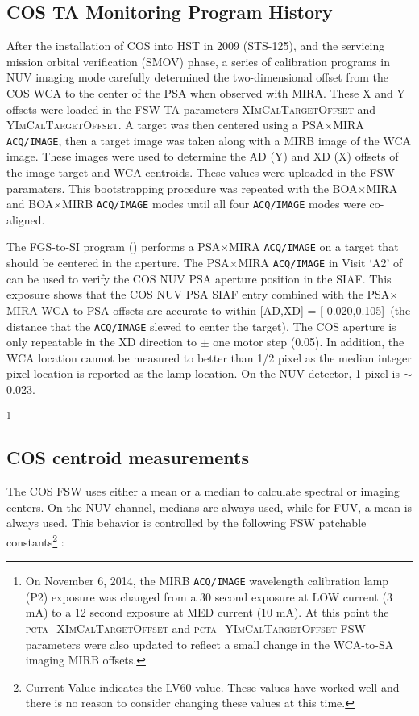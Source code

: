 \subsection{COS TA Monitoring Program History}\label{subsec:History}
After the installation of COS into HST in 2009 (STS-125), and the
servicing mission orbital verification (SMOV) phase,
a series of calibration programs in NUV imaging mode carefully determined the two-dimensional offset from the COS WCA to the center of the PSA when observed with MIRA.
These X and Y offsets were loaded in the FSW TA parameters \textsc{XImCalTargetOffset} and \textsc{YImCalTargetOffset}.
A target was then centered using a PSA$\times$MIRA \texttt{ACQ/IMAGE}, then a target image was taken along with a MIRB image
of the WCA image. These images were used to determine the AD (Y) and XD (X) offsets of the image target and WCA centroids.
These values were uploaded in the FSW paramaters. This bootstrapping procedure was repeated with the BOA$\times$MIRA
and BOA$\times$MIRB \texttt{ACQ/IMAGE} modes until all four \texttt{ACQ/IMAGE} modes were co-aligned.

The FGS-to-SI program () performs a PSA$\times$MIRA \texttt{ACQ/IMAGE} on a target that should be centered in the aperture.
The PSA$\times$MIRA \texttt{ACQ/IMAGE} in Visit `A2' of  can be used to verify the COS NUV PSA aperture position in the SIAF.
This exposure shows that the COS NUV PSA SIAF entry combined with the PSA$\times$MIRA WCA-to-PSA offsets are
accurate to within [AD,XD] = [-0.020,0.105]\arcsec\ (the distance that the \texttt{ACQ/IMAGE} slewed to center the target).
The COS aperture is only repeatable in the XD direction to $\pm$ one motor step (0.05\arcsec). In addition, the WCA location
cannot be measured to better than 1/2 pixel as the  median integer pixel location is reported as the lamp location.
On the NUV detector, 1 pixel is $\sim$ 0.023\arcsec.

\footnote{On November 6, 2014, the MIRB \texttt{ACQ/IMAGE} wavelength calibration lamp (P2) exposure was changed from a 30 second exposure
at LOW current (3 mA) to a 12 second exposure at MED current (10 mA). At this point the \textsc{pcta\_XImCalTargetOffset} and \textsc{pcta\_YImCalTargetOffset}
FSW parameters were also updated to reflect a small change in the WCA-to-SA imaging MIRB offsets.}

\subsection{COS centroid measurements}
	The COS FSW uses either a mean or a median to calculate spectral or imaging centers.
On the NUV channel, medians are always used, while for FUV, a mean is always used. This
behavior is controlled by the following FSW patchable constants\footnote{Current Value indicates the LV60 value. These values have worked
well and there is no reason to consider changing these values at this time.} :


